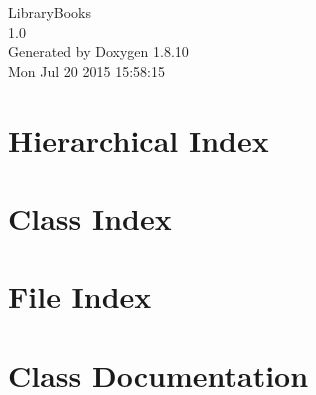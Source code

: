 \documentclass[twoside]{book}
\newcommand{\+}{\discretionary{\mbox{\scriptsize$\hookleftarrow$}}{}{}}
\newcommand{\clearemptydoublepage}{%
  \newpage{\pagestyle{empty}\cleardoublepage}%
}
\begin{document}
\hypersetup{pageanchor=false,
             bookmarks=true,
             bookmarksnumbered=true,
             pdfencoding=unicode
            }
\begin{titlepage}
\vspace*{7cm}
\begin{center}%
{\Large Library\+Books \\[1ex]\large 1.\+0 }\\
\vspace*{1cm}
{\large Generated by Doxygen 1.8.10}\\
\vspace*{0.5cm}
{\small Mon Jul 20 2015 15:58:15}\\
\end{center}
\end{titlepage}
\clearemptydoublepage
\tableofcontents
\clearemptydoublepage
{}
\hypersetup{pageanchor=true}

\chapter{Hierarchical Index}

\chapter{Class Index}

\chapter{File Index}

\chapter{Class Documentation}





















\end{document}
